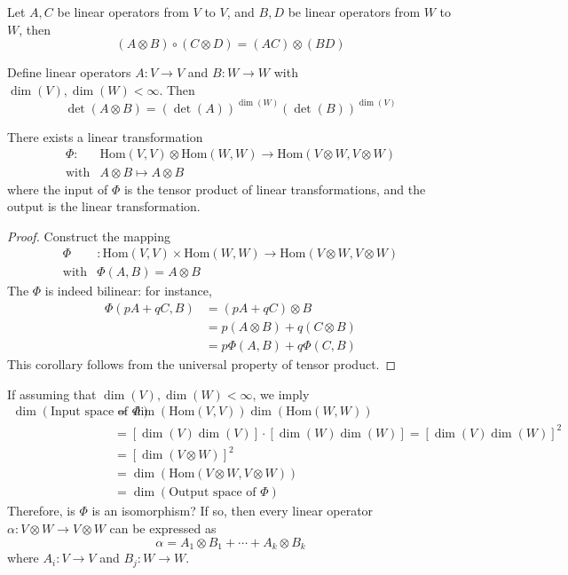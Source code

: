 \begin{proposition}
Let $A,C$ be linear operators from $V$ to $V$, and $B,D$ be linear operators from $W$ to $W$, then
\[
(A\otimes B)\circ(C\otimes D)=(AC)\otimes(BD)
\]
\end{proposition}

\begin{proposition}
Define linear operators $A:V\to V$ and $B:W\to W$ with $\dim(V),\dim(W)<\infty$.
Then
\[
\det(A\otimes B) = (\det(A))^{\dim(W)}(\det(B))^{\dim(V)}
\]
\end{proposition}

\begin{corollary}
There exists a linear transformation 
\[
\begin{array}{ll}
\Phi:&
\text{Hom}(V,V)\otimes\text{Hom}(W,W)\to
\text{Hom}(V\otimes W,V\otimes W)\\
\text{with}&A\otimes B\mapsto A\otimes B
\end{array}
\]
where the input of $\Phi$ is the tensor product of linear transformations, and the output is the linear transformation.
\end{corollary}
\begin{proof}
Construct the mapping
\[
\begin{array}{ll}
\Phi&:
\text{Hom}(V,V)\times\text{Hom}(W,W)\to
\text{Hom}(V\otimes W,V\otimes W)\\
\text{with}&\Phi(A,B)=A\otimes B
\end{array}
\]
The $\Phi$ is indeed bilinear: for instance, 
\begin{align*}
\Phi(pA+qC,B)&=(pA+qC)\otimes B\\
&=p(A\otimes B)+q(C\otimes B)\\
&=p\Phi(A,B)+q\Phi(C,B)
\end{align*}
This corollary follows from the universal property of tensor product.
\end{proof}
\begin{remark}
If assuming that $\dim(V),\dim(W)<\infty$, we imply
\begin{align*}
\dim(\text{Input space of $\Phi$})&=\dim(\text{Hom}(V,V))\dim(\text{Hom}(W,W))\\
&=
[\dim(V)\dim(V)]
\cdot
[\dim(W)\dim(W)]
=
[\dim(V)\dim(W)]^2\\
&=[\dim(V\otimes W)]^2\\
&=\dim(\text{Hom}(V\otimes W,V\otimes W))\\
&=\dim(\text{Output space of $\Phi$})
\end{align*}
Therefore, is $\Phi$ is an isomorphism?
If so, then every linear operator $\alpha:V\otimes W\to V\otimes W$ can be expressed as
\[
\alpha = A_1\otimes B_1+\cdots+A_k\otimes B_k
\]
where $A_i:V\to V$ and $B_j:W\to W$.
\end{remark}










